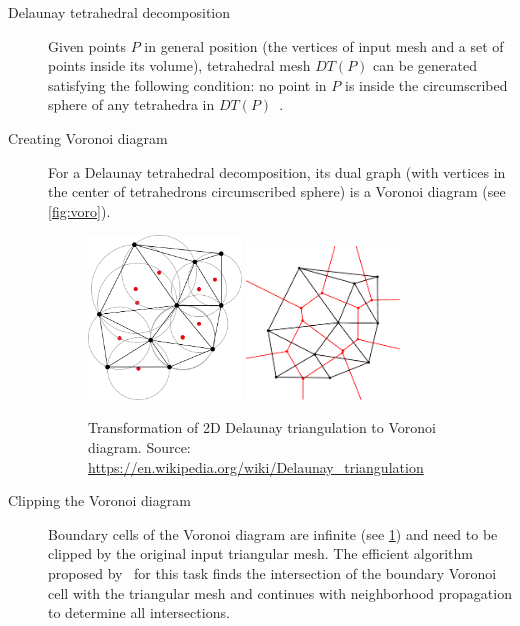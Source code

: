 \begin{description}
    \item[Delaunay tetrahedral decomposition] Given points $P$ in general position (the vertices of input mesh and a set of points inside its volume), tetrahedral mesh $DT(P)$ can be generated satisfying the following condition: no point in $P$ is inside the circumscribed sphere of any tetrahedra in $DT(P)$~\cite{cignoni1993parallel}.
    \item[Creating Voronoi diagram] For a Delaunay tetrahedral decomposition, its dual graph (with vertices in the center of tetrahedrons circumscribed sphere) is a Voronoi diagram (see \cref{fig:voro}).
    
 \begin{figure}
    \centering
    \includegraphics[width=0.4\textwidth]{img/delaunay}
    \includegraphics[width=0.4\textwidth]{img/voronoi}
    \caption{Transformation of 2D Delaunay triangulation to Voronoi diagram. Source: \url{https://en.wikipedia.org/wiki/Delaunay\_triangulation}}
    \label{fig:DT}
\end{figure}

    \item[Clipping the Voronoi diagram] Boundary cells of the Voronoi diagram are infinite (see \cref{fig:DT}) and need to be clipped by the original input triangular mesh. The efficient algorithm proposed by~\citet{yan2010efficient} for this task finds the intersection of the boundary Voronoi cell with the triangular mesh and continues with neighborhood propagation to determine all intersections. 
\end{description}

